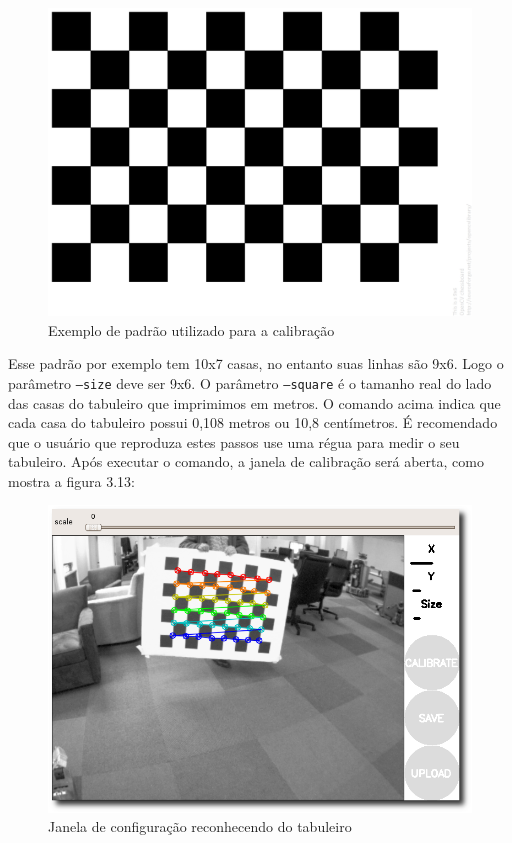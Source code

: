 \begin{figure}[!htb]
	\centering
		\includegraphics[width= \textwidth]{Imagens/figura3-3E3-12.png}
	\caption{Exemplo de padrão utilizado para a calibração}
	\label{fig3:12}
\end{figure}


Esse padrão por exemplo tem 10x7 casas, no entanto suas linhas são 9x6. Logo o parâmetro \texttt{--size} deve ser 9x6.
O parâmetro \texttt{--square} é o tamanho real do lado das casas do tabuleiro que imprimimos em metros. O comando acima indica que cada casa do tabuleiro possui 0,108 metros ou 10,8 centímetros. É recomendado que o usuário que reproduza estes passos use uma régua para medir o seu tabuleiro.
Após executar o comando, a janela de calibração será aberta, como mostra a figura 3.13:

\begin{figure}[!htb]
	\centering
		\includegraphics[width= \textwidth]{Imagens/figura3-13.png}
	\caption{Janela de configuração reconhecendo do tabuleiro}
	\label{fig3:13}
\end{figure}

